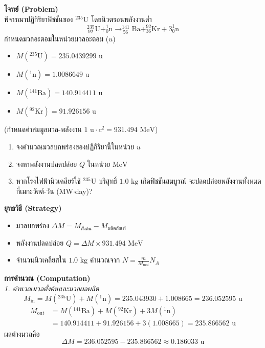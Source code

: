 \begin{psctexample}
\textbf{โจทย์ (Problem)} \\
พิจารณาปฏิกิริยาฟิชชันของ $^{235}\text{U}$ โดยนิวตรอนพลังงานต่ำ
\begin{equation}
^{235}_{\ 92}\text{U} + ^1_0\text{n} \to ^{141}_{\ 56}\text{Ba} + ^{92}_{36}\text{Kr} + 3 ^1_0\text{n}
\end{equation}
กำหนดมวลอะตอมในหน่วยมวลอะตอม ($u$)
\begin{itemize}
    \item $M(^{235}\text{U}) = 235.0439299\text{ u}$
    \item $M(^1\text{n}) = 1.0086649\text{ u}$
    \item $M(^{141}\text{Ba}) = 140.914411\text{ u}$
    \item $M(^{92}\text{Kr}) = 91.926156\text{ u}$
\end{itemize}
(กำหนดค่าสมมูลมวล-พลังงาน $1\text{ u} \cdot c^2 = 931.494\text{ MeV}$)
\begin{enumerate}
    \item จงคำนวณมวลบกพร่องของปฏิกิริยานี้ในหน่วย $u$
    \item จงหาพลังงานปลดปล่อย $Q$ ในหน่วย $\text{MeV}$
    \item หากโรงไฟฟ้านิวเคลียร์ใช้ $^{235}\text{U}$ บริสุทธิ์ $1.0\text{ kg}$ เกิดฟิชชันสมบูรณ์ จะปลดปล่อยพลังงานทั้งหมดกี่เมกะวัตต์-วัน (MW$\cdot$day)?
\end{enumerate}

\textbf{ยุทธวิธี (Strategy)} \\
\begin{itemize}
    \item มวลบกพร่อง $\Delta M = M_{\text{ตั้งต้น}} - M_{\text{ผลิตภัณฑ์}}$
    \item พลังงานปลดปล่อย $Q = \Delta M \times 931.494\text{ MeV}$
    \item จำนวนนิวเคลียสใน $1.0\text{ kg}$ คำนวณจาก $N = \frac{m}{M_{\text{mol}}} N_A$
\end{itemize}

\textbf{การคำนวณ (Computation)} \\
\textit{1. คำนวณมวลตั้งต้นและมวลผลผลิต}
\begin{equation}
M_{\text{in}} = M(^{235}\text{U}) + M(^1\text{n}) = 235.043930 + 1.008665 = 236.052595\text{ u}
\end{equation}
\begin{align}
M_{\text{out}} &= M(^{141}\text{Ba}) + M(^{92}\text{Kr}) + 3 M(^1\text{n}) \nonumber \\
&= 140.914411 + 91.926156 + 3(1.008665) = 235.866562\text{ u}
\end{align}
ผลต่างมวลคือ
\begin{equation}
\Delta M = 236.052595 - 235.866562 \approx 0.186033\text{ u}
\end{equation}


\end{psctexample}
